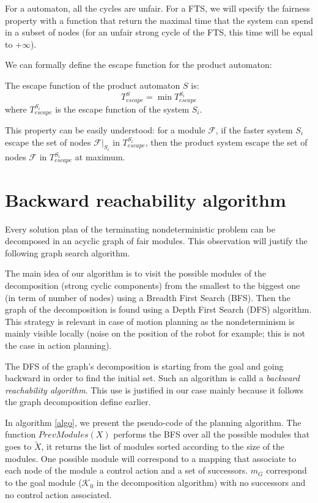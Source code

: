 For a \buchi{} automaton, all the cycles are unfair.
For a FTS, we will specify the fairness property with a function that return the maximal time that the system can spend in a subset of nodes
(for an unfair strong cycle of the FTS, this time will be equal to $+\infty$).

We can formally define the escape function for the product automaton:
\begin{property}
The escape function of the product automaton $S$ is:
$$T_{escape}^S = \min{T_{escape}^{S_i}}$$
where $T_{escape}^{S_i}$ is the escape function of the system $S_i$.
\end{property}
This property can be easily understood: for a module $\mathcal{F}$, if the faster system $S_i$ escape the set of nodes $\mathcal{F}|_{S_i}$ in $T^{S_i}_{escape}$, then the product system escape the set of nodes $\mathcal{F}$ in $T^{S_i}_{escape}$ at maximum.

\section{Backward reachability algorithm}
Every solution plan of the terminating nondeterministic problem can be decomposed in an acyclic graph of fair modules.
This observation will justify the following graph search algorithm.

The main idea of our algorithm is to visit the possible modules of the decomposition (strong cyclic components) from the smallest to the biggest  one (in term of number of nodes) using a Breadth First Search (BFS).
Then the graph of the decomposition is found using a Depth First Search (DFS) algorithm.
This strategy is relevant in case of motion planning as the nondeterminism is mainly visible locally (noise on the position of the robot for example; this is not the case in action planning).

The DFS of the graph's decomposition is starting from the goal and going backward in order to find the initial set. Such an algorithm is calld a \textit{backward reachability algorithm}. This use is justified in our case mainly because it follows the graph decomposition define earlier.

In algorithm \ref{algo}, we present the pseudo-code of the planning algorithm.
The function 
$PrevModules(X)$ performs the BFS over all the possible modules that goes to $\tilde{X}$, it returns the list of modules sorted according to the size of the modules.
One possible module will correspond to a mapping that associate to each node of the module a control action and a set of successors.
$m_G$ correspond to the goal module ($\mathcal{K}_0$ in the decomposition algorithm) with no successors and no control action associated.

